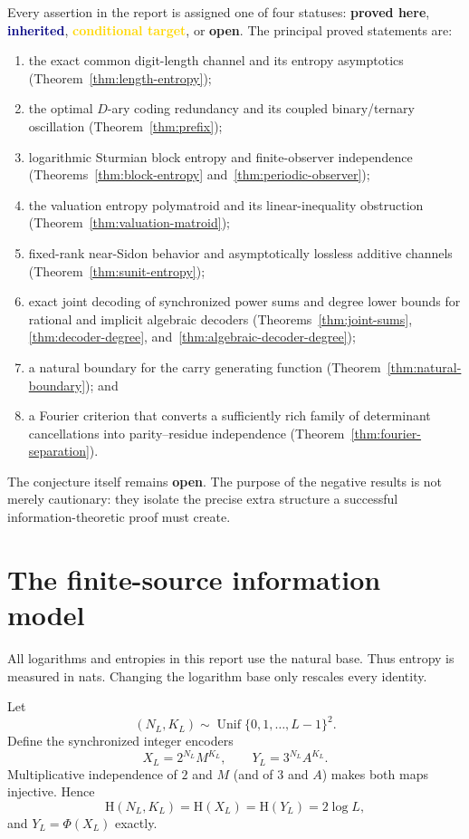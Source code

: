 \documentclass[11pt,oneside]{article}
\theoremstyle{definition}
\theoremstyle{remark}
\newcommand{\HH}{\mathrm{H}}
\newcommand{\proved}{\textcolor{deepgreen}{\textbf{proved here}}}
\newcommand{\inherited}{\textcolor{navy}{\textbf{inherited}}}
\newcommand{\conditional}{\textcolor{gold}{\textbf{conditional target}}}
\newcommand{\openstatus}{\textcolor{brick}{\textbf{open}}}
\begin{document}
Every assertion in the report is assigned one of four statuses: \proved, \inherited, \conditional, or \openstatus.  The principal proved statements are:
\begin{enumerate}
  \item the exact common digit-length channel and its entropy asymptotics (Theorem~\ref{thm:length-entropy});
  \item the optimal $D$-ary coding redundancy and its coupled binary/ternary oscillation (Theorem~\ref{thm:prefix});
  \item logarithmic Sturmian block entropy and finite-observer independence (Theorems~\ref{thm:block-entropy} and~\ref{thm:periodic-observer});
  \item the valuation entropy polymatroid and its linear-inequality obstruction (Theorem~\ref{thm:valuation-matroid});
  \item fixed-rank near-Sidon behavior and asymptotically lossless additive channels (Theorem~\ref{thm:sunit-entropy});
  \item exact joint decoding of synchronized power sums and degree lower bounds for rational and implicit algebraic decoders (Theorems~\ref{thm:joint-sums}, \ref{thm:decoder-degree}, and~\ref{thm:algebraic-decoder-degree});
  \item a natural boundary for the carry generating function (Theorem~\ref{thm:natural-boundary}); and
  \item a Fourier criterion that converts a sufficiently rich family of determinant cancellations into parity--residue independence (Theorem~\ref{thm:fourier-separation}).
\end{enumerate}

The conjecture itself remains \openstatus.  The purpose of the negative results is not merely cautionary: they isolate the precise extra structure a successful information-theoretic proof must create.

\section{The finite-source information model}

All logarithms and entropies in this report use the natural base.  Thus entropy is measured in nats.  Changing the logarithm base only rescales every identity.

Let
\begin{equation}\label{eq:source}
  (N_L,K_L)\sim\operatorname{Unif}\{0,1,\ldots,L-1\}^2.
\end{equation}
Define the synchronized integer encoders
\begin{equation}\label{eq:XY}
  X_L=2^{N_L}M^{K_L},\qquad Y_L=3^{N_L}A^{K_L}.
\end{equation}
Multiplicative independence of $2$ and $M$ (and of $3$ and $A$) makes both maps injective.  Hence
\begin{equation}\label{eq:source-entropy}
  \HH(N_L,K_L)=\HH(X_L)=\HH(Y_L)=2\log L,
\end{equation}
and $Y_L=\Phi(X_L)$ exactly.
\end{document}
